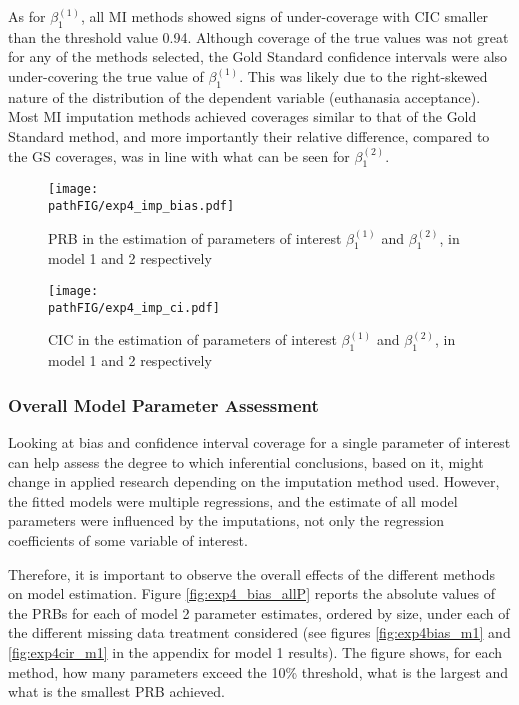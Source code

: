 	As for $\beta^{(1)}_{1}$, all MI methods showed signs of under-coverage with CIC smaller than the threshold 
	value 0.94.
	Although coverage of the true values was not great for any of the methods selected, the Gold Standard
	confidence intervals were also under-covering the true value of $\beta^{(1)}_{1}$.
	This was likely due to the right-skewed nature of the distribution of the dependent variable (euthanasia 
	acceptance).
	Most MI imputation methods achieved coverages similar to that of the Gold Standard method, and more importantly 
	their relative difference, compared to the GS coverages, was in line with what can be seen for $\beta^{(2)}_{1}$.

\begin{figure}[h]
	\centering
	\texttt{[image: \\pathFIG/exp4\_imp\_bias.pdf]}
	\caption{PRB in the estimation of parameters of interest $\beta^{(1)}_{1}$ and $\beta^{(2)}_{1}$, 
		in model 1 and 2 respectively}
	\label{fig:exp4bias}
\end{figure}

\begin{figure}[h]
	\centering
	\texttt{[image: \\pathFIG/exp4\_imp\_ci.pdf]}
	\caption{CIC in the estimation of parameters of interest $\beta^{(1)}_{1}$ and $\beta^{(2)}_{1}$, 
		in model 1 and 2 respectively}
	\label{fig:exp4ci}
\end{figure}

\FloatBarrier

	\subsubsection{Overall Model Parameter Assessment}
	
	Looking at bias and confidence interval coverage for a single parameter of interest can help assess
	the degree to which inferential conclusions, based on it, might change in applied research depending 
	on the imputation method used.
	However, the fitted models were multiple regressions, and the estimate of all model parameters were 
	influenced by the imputations, not only the regression coefficients of some variable of interest.

	Therefore, it is important to observe the overall effects of the different methods on model estimation.
	Figure \ref{fig:exp4_bias_allP} reports the absolute values of the PRBs for each of model 2 parameter 
	estimates, ordered by size, under each of the different missing data treatment considered 
	(see figures \ref{fig:exp4bias_m1} and \ref{fig:exp4cir_m1} in the appendix for model 1 results).
	The figure shows, for each method, how many parameters exceed the 10\% threshold, what is the largest and 
	what is the smallest PRB achieved.

